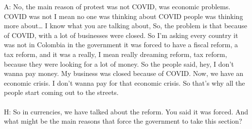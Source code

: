 \documentclass{phyasgn}\usepackage{nag}
\begin{document}
A: No, the main reason of protest was not COVID, was economic problems. COVID was not I mean no one was thinking about COVID people was thinking more about… I know what you are talking about, So, the problem is that because of COVID, with a lot of businesses were closed. So I’m asking every country it was not in Colombia in the government it was forced to have a fiscal reform, a tax reform, and it was a really, I mean really dreaming reform, tax reform, because they were looking for a lot of money. So the people said, hey, I don't wanna pay money. My business was closed because of COVID. Now, we have an economic crisis. I don't wanna pay for that economic crisis. So that's why all the people start coming out to the streets.\\
\\
H: So in currencies, we have talked about the reform. You said it was forced. And what might be the main reasons that force the government to take this section?\\
\end{document}
